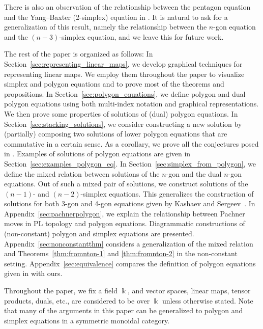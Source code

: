 \documentclass[10pt,a4paper]{amsart}
\numberwithin{equation}{section}
\theoremstyle{definition}
\begin{document}
There is also an observation of the relationship between the pentagon equation and the Yang--Baxter (2-simplex) equation in \cite{evripidou2024quadrirational, kashaev1995heisenberg,suzuki2018universal}. It is natural to ask for a generalization of this result, namely the relationship between the $n$-gon equation and the $(n-3)$-simplex equation, and we leave this for future work.

The rest of the paper is organized as follows: In Section~\ref{sec:representing_linear_maps}, we develop graphical techniques for representing linear maps. We employ them throughout the paper to visualize simplex and polygon equations and to prove most of the theorems and propositions. In Section~\ref{sec:polygon_equations}, we define polygon and dual polygon equations using both multi-index notation and graphical representations. We then prove some properties of solutions of (dual) polygon equations. In Section~\ref{sec:stacking_solutions}, we consider constructing a new solution by (partially) composing two solutions of lower polygon equations that are commutative in a certain sense. As a corollary, we prove all the conjectures posed in \cite{muller2024structure}. Examples of solutions of polygon equations are given in Section~\ref{sec:examples_polygon_eq}. In Section~\ref{sec:simplex_from_polygon}, we define the mixed relation between solutions of the $n$-gon and the dual $n$-gon equations. Out of such a mixed pair of solutions, we construct solutions of the $(n-1)$- and $(n-2)$-simplex equations. This generalizes the construction of solutions for both 3-gon and 4-gon equations given by Kashaev and Sergeev~\cite{kashaev1998pentagon}. In Appendix~\ref{sec:pachnerpolygon}, we explain the relationship between Pachner moves in PL topology and polygon equations. Diagrammatic constructions of (non-constant) polygon and simplex equations are presented. Appendix~\ref{sec:nonconstantthm} considers a generalization of the mixed relation and Theorems~\ref{thm:fromnton-1} and \ref{thm:fromnton-2} in the non-constant setting. Appendix~\ref{sec:equivalence} compares the definition of polygon equations given in \cite{dimakis2015simplex} with ours.

Throughout the paper, we fix a field $\Bbbk$, and vector spaces, linear maps, tensor products, duals, etc., are considered to be over $\Bbbk$ unless otherwise stated. Note that many of the arguments in this paper can be generalized to polygon and simplex equations in a symmetric monoidal category.
\end{document}
